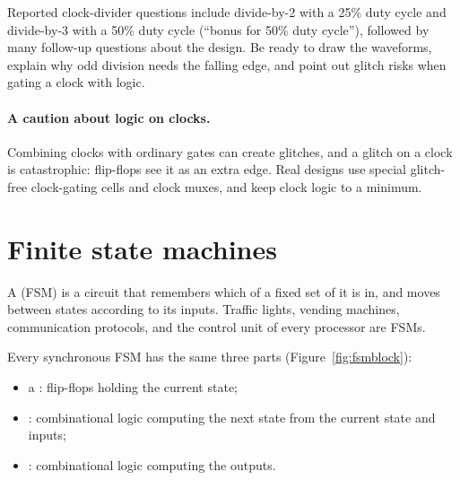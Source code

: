 \begin{onoa}
Reported clock-divider questions include divide-by-2 with a 25\% duty cycle and divide-by-3 with a 50\% duty cycle (``bonus for 50\% duty cycle''), followed by many follow-up questions about the design. Be ready to draw the waveforms, explain why odd division needs the falling edge, and point out glitch risks when gating a clock with logic.
\end{onoa}

\paragraph{A caution about logic on clocks.} Combining clocks with ordinary gates can create glitches, and a glitch on a clock is catastrophic: flip-flops see it as an extra edge. Real designs use special glitch-free clock-gating cells and clock muxes, and keep clock logic to a minimum.

\section{Finite state machines}

A  (FSM) is a circuit that remembers which of a fixed set of  it is in, and moves between states according to its inputs. Traffic lights, vending machines, communication protocols, and the control unit of every processor are FSMs.

Every synchronous FSM has the same three parts (Figure~\ref{fig:fsmblock}):
\begin{itemize}
  \item a : flip-flops holding the current state;
  \item {}: combinational logic computing the next state from the current state and inputs;
  \item {}: combinational logic computing the outputs.
\end{itemize}

